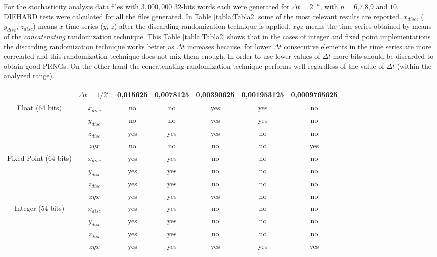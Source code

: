 For the stochasticity analysis data files with $3,000,000$ $32$-bits words each were generated for $\Delta t=2^{-n}$, with $n=6$,$7$,$8$,$9$ and $10$.
DIEHARD tests were calculated for all the files generated.
In Table \ref{tabla:Tabla2} some of the most relevant results are reported.
$x_{disc}$, ( $y_{disc}$, $z_{disc}$) means $x$-time series ($y$, $z$) after the discarding randomization technique is applied.
$xyz$ means the time series obtained by means of the \textit{concatenating} randomization technique.
This Table \ref{tabla:Tabla2} shows that in the cases of integer and fixed point implementations the discarding randomization technique works better as $\Delta t$ increases because, for lower $\Delta t$ consecutive elements in the time series are more correlated and this randomization technique does not mix them enough.
In order to use lower values of  $\Delta t$ more bits should be discarded to obtain good PRNGs.
On the other hand the concatenating randomization technique performs well regardless of the value of $\Delta t$ (within the analyzed range).

\begin{table*} [tb]
\begin{center}
\caption{DIEHARD tests results.}
\begin{tabular}{|c|c|c|c|c|c|c|}
\hline\hline
						& $\Delta t=1/2^n$	&0,015625	&0,0078125	&0,00390625	&0,001953125	&0,0009765625	\\
\hline\hline
Float ($64$ bits)		&$x_{disc}$			&no    		&no    		&yes  		&yes 			&no  			\\
\hline
						&$y_{disc}$    	 	&no      	&no       	&yes    	&yes  			&no 			\\
\hline
						&$z_{disc}$   		&yes     	&yes       	&yes    	&no 			&no				\\
\hline
						&$zyx$             	&no   		&no      	&no        	&no 			&yes 			\\
\hline\hline
Fixed Point ($64$ bits)	&$x_{disc}$       	&yes    	&yes      	&no    		&no  			&no    			\\
\hline
						&$y_{disc}$        	&yes       	&yes    	&no     	&no  			&no    			\\
\hline
						&$z_{disc}$      	&yes     	&yes    	&no    		&no  			&no    			\\
\hline
						&$zyx$            	&yes    	&yes    	&yes   		&no  			&no    			\\
\hline\hline
Integer ($54$ bits)		&$x_{disc}$     	&yes   		&yes  		&no  		&no  			&no    			\\
\hline
						&$y_{disc}$       	&yes   		&yes     	&no  		&no  			&no    			\\
\hline
						&$z_{disc}$  		&yes 		&yes    	&no			&no  			&no    			\\
\hline
						&$zyx$       		&yes  		&yes 		&yes  		&yes 			&yes  			\\
\hline
\end{tabular}\end{center}
\label{tabla:Tabla2}
\end{table*}

